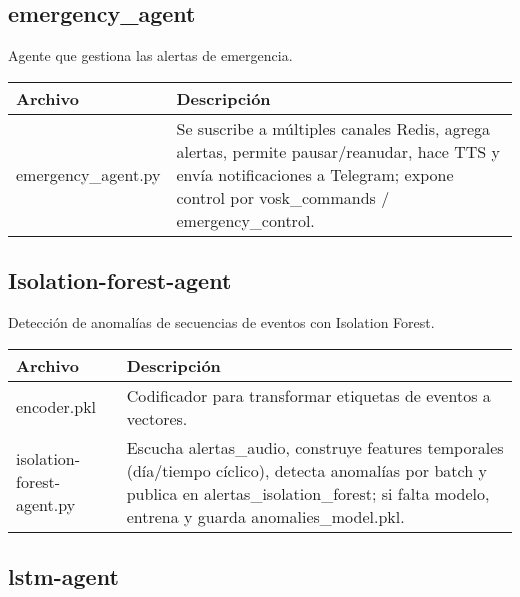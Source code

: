\subsection*{emergency\_agent}

Agente que gestiona las alertas de emergencia.

\begin{table}[H]
  \doublespacing
  \begin{tabularx}{\textwidth}{l X}
    \hline
    \textbf{Archivo}    & \textbf{Descripción} \\
    \hline
    emergency\_agent.py &
    Se suscribe a múltiples canales Redis, agrega alertas, permite pausar/reanudar, hace TTS y envía notificaciones a Telegram; expone control por vosk\_commands / emergency\_control.
    \\
    \hline
  \end{tabularx}
\end{table}

\subsection*{Isolation-forest-agent}

Detección de anomalías de secuencias de eventos con Isolation Forest.

\begin{table}[H]
  \doublespacing
  \begin{tabularx}{\textwidth}{l X}
    \hline
    \textbf{Archivo}          & \textbf{Descripción}                                                                                                                                                         \\
    \hline
    encoder.pkl               &
    Codificador para transformar etiquetas de eventos a vectores.                                                                                                                                            \\
    isolation-forest-agent.py &
    Escucha alertas\_audio, construye features temporales (día/tiempo cíclico), detecta anomalías por batch y publica en alertas\_isolation\_forest; si falta modelo, entrena y guarda anomalies\_model.pkl. \\
    \hline
  \end{tabularx}
\end{table}

\subsection*{lstm-agent}

